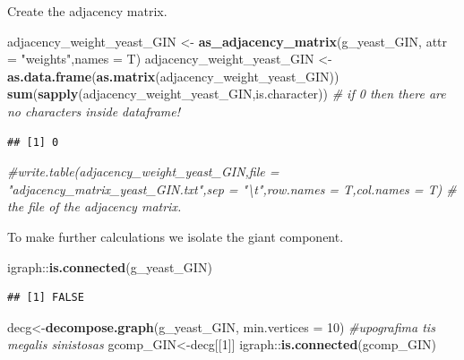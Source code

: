 \documentclass[12pt,]{article}
\newenvironment{Shaded}{\begin{snugshade}}{\end{snugshade}}
\newcommand{\KeywordTok}[1]{\textcolor[rgb]{0.13,0.29,0.53}{\textbf{{#1}}}}
\newcommand{\DataTypeTok}[1]{\textcolor[rgb]{0.13,0.29,0.53}{{#1}}}
\newcommand{\DecValTok}[1]{\textcolor[rgb]{0.00,0.00,0.81}{{#1}}}
\newcommand{\StringTok}[1]{\textcolor[rgb]{0.31,0.60,0.02}{{#1}}}
\newcommand{\CommentTok}[1]{\textcolor[rgb]{0.56,0.35,0.01}{\textit{{#1}}}}
\newcommand{\NormalTok}[1]{{#1}}
\begin{document}
Create the adjacency matrix.

\begin{Shaded}
\begin{Highlighting}[]
\NormalTok{adjacency_weight_yeast_GIN <-}\StringTok{ }\KeywordTok{as_adjacency_matrix}\NormalTok{(g_yeast_GIN, }\DataTypeTok{attr =} \StringTok{"weights"}\NormalTok{,}\DataTypeTok{names =} \NormalTok{T)}
\NormalTok{adjacency_weight_yeast_GIN <-}\StringTok{ }\KeywordTok{as.data.frame}\NormalTok{(}\KeywordTok{as.matrix}\NormalTok{(adjacency_weight_yeast_GIN))}
\KeywordTok{sum}\NormalTok{(}\KeywordTok{sapply}\NormalTok{(adjacency_weight_yeast_GIN,is.character)) }\CommentTok{# if 0 then there are no characters inside dataframe!}
\end{Highlighting}
\end{Shaded}

\begin{verbatim}
## [1] 0
\end{verbatim}

\begin{Shaded}
\begin{Highlighting}[]
\CommentTok{#write.table(adjacency_weight_yeast_GIN,file = "adjacency_matrix_yeast_GIN.txt",sep = "\textbackslash{}t",row.names = T,col.names = T) # the file of the adjacency matrix.}
\end{Highlighting}
\end{Shaded}

To make further calculations we isolate the giant component.

\begin{Shaded}
\begin{Highlighting}[]
\NormalTok{igraph::}\KeywordTok{is.connected}\NormalTok{(g_yeast_GIN)}
\end{Highlighting}
\end{Shaded}

\begin{verbatim}
## [1] FALSE
\end{verbatim}

\begin{Shaded}
\begin{Highlighting}[]
\NormalTok{decg<-}\KeywordTok{decompose.graph}\NormalTok{(g_yeast_GIN, }\DataTypeTok{min.vertices =} \DecValTok{10}\NormalTok{) }\CommentTok{#upografima tis megalis sinistosas }
\NormalTok{gcomp_GIN<-decg[[}\DecValTok{1}\NormalTok{]]}
\NormalTok{igraph::}\KeywordTok{is.connected}\NormalTok{(gcomp_GIN)}
\end{Highlighting}
\end{Shaded}
\end{document}
